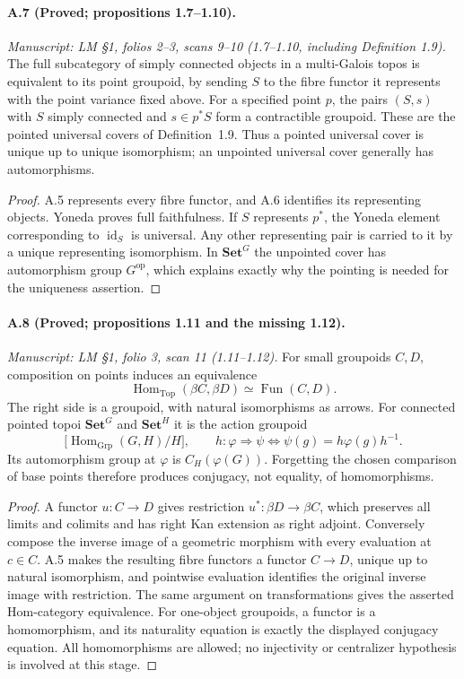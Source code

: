 \paragraph{A.7 (Proved; propositions 1.7--1.10).}
\textit{Manuscript: LM \S1, folios 2--3, scans 9--10 (1.7--1.10, including Definition 1.9).}
The full subcategory of simply connected objects in a multi-Galois topos is equivalent to its point groupoid, by sending $S$ to the fibre functor it represents with the point variance fixed above. For a specified point $p$, the pairs $(S,s)$ with $S$ simply connected and $s\in p^*S$ form a contractible groupoid. These are the pointed universal covers of Definition~1.9. Thus a pointed universal cover is unique up to unique isomorphism; an unpointed universal cover generally has automorphisms.
\begin{proof}
A.5 represents every fibre functor, and A.6 identifies its representing objects. Yoneda proves full faithfulness. If $S$ represents $p^*$, the Yoneda element corresponding to $\operatorname{id}_S$ is universal. Any other representing pair is carried to it by a unique representing isomorphism. In $\mathbf{Set}^{G}$ the unpointed cover has automorphism group $G^{\mathrm{op}}$, which explains exactly why the pointing is needed for the uniqueness assertion. 
\end{proof}

\paragraph{A.8 (Proved; propositions 1.11 and the missing 1.12).}
\textit{Manuscript: LM \S1, folio 3, scan 11 (1.11--1.12).}
For small groupoids $C,D$, composition on points induces an equivalence
\[
 \operatorname{Hom}_{\mathrm{Top}}(\beta C,\beta D)
 \simeq\operatorname{Fun}(C,D).
\]
The right side is a groupoid, with natural isomorphisms as arrows. For connected pointed topoi $\mathbf{Set}^{G}$ and $\mathbf{Set}^{H}$ it is the action groupoid
\[
 \bigl[\operatorname{Hom}_{\mathrm{Grp}}(G,H)/H\bigr],
 \qquad h:\varphi\Rightarrow\psi\iff\psi(g)=h\varphi(g)h^{-1}.
\]
Its automorphism group at $\varphi$ is $C_H(\varphi(G))$. Forgetting the chosen comparison of base points therefore produces conjugacy, not equality, of homomorphisms.
\begin{proof}
A functor $u:C\to D$ gives restriction $u^*:\beta D\to\beta C$, which preserves all limits and colimits and has right Kan extension as right adjoint. Conversely compose the inverse image of a geometric morphism with every evaluation at $c\in C$. A.5 makes the resulting fibre functors a functor $C\to D$, unique up to natural isomorphism, and pointwise evaluation identifies the original inverse image with restriction. The same argument on transformations gives the asserted Hom-category equivalence. For one-object groupoids, a functor is a homomorphism, and its naturality equation is exactly the displayed conjugacy equation. All homomorphisms are allowed; no injectivity or centralizer hypothesis is involved at this stage. 
\end{proof}

